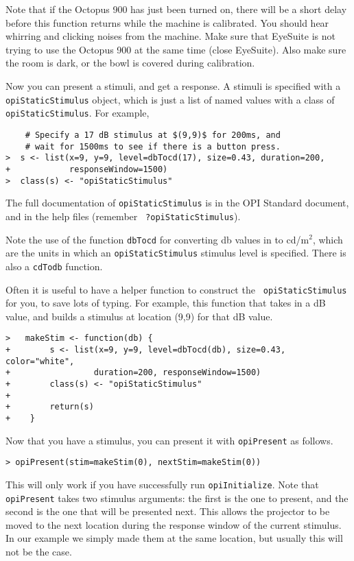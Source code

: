 \documentclass{article}
\begin{document}
Note that if the Octopus 900 has just been turned on, there will
be a short delay before this function returns while the machine is
calibrated. You should hear whirring and clicking noises from the
machine.  Make sure that EyeSuite is not trying to use the
Octopus 900 at the same time (close EyeSuite).
Also make sure the room is dark, or the bowl is covered during calibration.

Now you can present a stimuli, and get a response. A stimuli is specified with a {\tt
opiStaticStimulus} object, which is just a list of named values with a class of {\tt
opiStaticStimulus}. For example, 

\begin{verbatim}
    # Specify a 17 dB stimulus at $(9,9)$ for 200ms, and 
    # wait for 1500ms to see if there is a button press.
>  s <- list(x=9, y=9, level=dbTocd(17), size=0.43, duration=200, 
+            responseWindow=1500)
>  class(s) <- "opiStaticStimulus"
\end{verbatim}

The full documentation of {\tt opiStaticStimulus} is in the
OPI Standard document, and in the help files (remember {\tt
?opiStaticStimulus}).

Note the use of the function {\tt dbTocd} for converting db values
in to cd/m$^2$, which are the units in which an {\tt opiStaticStimulus} 
stimulus level is specified. There is also a {\tt cdTodb} function.

Often it is useful to have a helper function to construct the {\tt
opiStaticStimulus} for you, to save lots of typing. For example,
this function that takes in a dB value, and builds a stimulus at
location (9,9) for that dB value.

\begin{verbatim}
>   makeStim <- function(db) {
+        s <- list(x=9, y=9, level=dbTocd(db), size=0.43, color="white",
+                 duration=200, responseWindow=1500)
+        class(s) <- "opiStaticStimulus"
+
+        return(s)
+    }
\end{verbatim}            

Now that you have a stimulus, you can present it with {\tt opiPresent} as follows.
\begin{verbatim}
> opiPresent(stim=makeStim(0), nextStim=makeStim(0))
\end{verbatim}            
This will only work if you have successfully run {\tt opiInitialize}.
Note that {\tt opiPresent} takes two stimulus arguments: the first is the one to present, and
the second is the one that will be presented next. This allows the projector to be moved to
the next location during the response window of the current stimulus.
In our example we simply made them at the same location, but usually this will not be the case.
\end{document}
